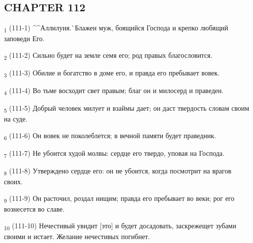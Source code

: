 \subsection{CHAPTER 112}
\begin{tcolorbox}
\textsubscript{1} (111-1) ^^Аллилуия.^^ Блажен муж, боящийся Господа и крепко любящий заповеди Его.
\end{tcolorbox}
\begin{tcolorbox}
\textsubscript{2} (111-2) Сильно будет на земле семя его; род правых благословится.
\end{tcolorbox}
\begin{tcolorbox}
\textsubscript{3} (111-3) Обилие и богатство в доме его, и правда его пребывает вовек.
\end{tcolorbox}
\begin{tcolorbox}
\textsubscript{4} (111-4) Во тьме восходит свет правым; благ он и милосерд и праведен.
\end{tcolorbox}
\begin{tcolorbox}
\textsubscript{5} (111-5) Добрый человек милует и взаймы дает; он даст твердость словам своим на суде.
\end{tcolorbox}
\begin{tcolorbox}
\textsubscript{6} (111-6) Он вовек не поколеблется; в вечной памяти будет праведник.
\end{tcolorbox}
\begin{tcolorbox}
\textsubscript{7} (111-7) Не убоится худой молвы: сердце его твердо, уповая на Господа.
\end{tcolorbox}
\begin{tcolorbox}
\textsubscript{8} (111-8) Утверждено сердце его: он не убоится, когда посмотрит на врагов своих.
\end{tcolorbox}
\begin{tcolorbox}
\textsubscript{9} (111-9) Он расточил, роздал нищим; правда его пребывает во веки; рог его вознесется во славе.
\end{tcolorbox}
\begin{tcolorbox}
\textsubscript{10} (111-10) Нечестивый увидит [это] и будет досадовать, заскрежещет зубами своими и истает. Желание нечестивых погибнет.
\end{tcolorbox}
